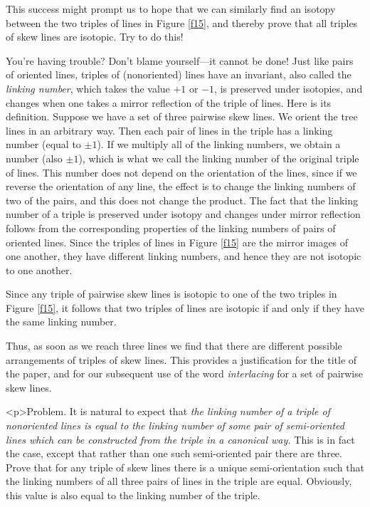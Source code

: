 \documentclass{article}
\def\<{\textless}
\def\>{\textgreater}
\begin{document}
This success might prompt us to hope that we can similarly find an isotopy
between the two triples of lines in Figure \ref{f15}, and thereby 
prove that all triples of skew lines are isotopic. Try to do this!

You're having trouble? Don't blame yourself---it cannot be done! Just like
pairs of oriented lines, triples of (nonoriented) lines have an invariant, also
called the {\em linking number\/}, which takes the value $+1$ or $-1$, is
preserved under isotopies, and changes when one takes a mirror reflection of
the triple of lines. Here is its definition. Suppose we have a set of three
pairwise skew lines. We orient the tree lines in an arbitrary way. Then each
pair of lines in the triple has a linking number (equal to $\pm 1$). If we
multiply all of the linking
 numbers, we obtain a number (also $\pm1$),
which is what we call the linking
 number of the original triple of lines.
This number does not depend on the orientation of the lines, since if we
reverse the orientation of any line, the effect is to change the linking
numbers of two of the pairs, and this does not change the product. The
fact that the linking number of a triple is preserved under isotopy and
changes under mirror reflection follows from the corresponding properties of
the linking numbers of pairs of oriented lines. Since the triples of lines
in Figure \ref{f15} are the mirror images of one another, they have 
different linking
numbers, and hence they are not isotopic to one another.

Since any triple of pairwise skew lines is isotopic to one of the two triples
in Figure \ref{f15}, it follows that two triples of lines are isotopic 
if and only if they have the same linking number.

Thus, as soon as we reach three lines we find that there are different possible
arrangements of triples of skew lines. This provides a justification for the
title of the paper, and for our subsequent use of the word {\em interlacing\/}
for a set of pairwise skew lines.

\<p\>{\bfit Problem.\/} It is natural to expect that {\em 
the linking number of a triple
of nonoriented lines is equal to the linking number of some pair of
semi-oriented lines which can be constructed from the triple in a canonical
way.} This is in fact the case, except that rather than one such semi-oriented
pair there are three. Prove that for any triple of skew lines there is a unique
semi-orientation such that the linking numbers of all three pairs of lines
in the triple are equal. Obviously, this value is also equal to the linking
number of the triple.
\end{document}
